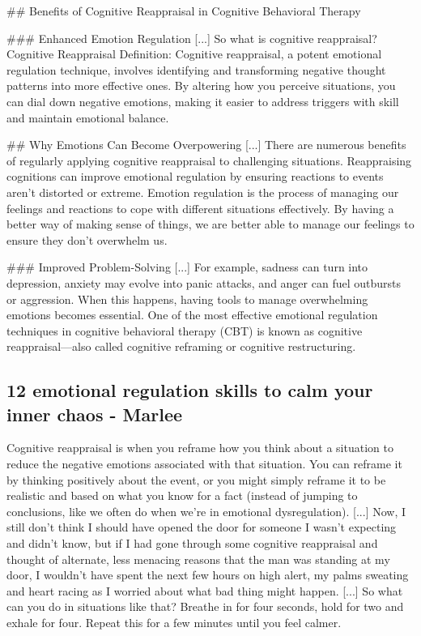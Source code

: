 \documentclass[12pt]{article}
\begin{document}
\#\# Benefits of Cognitive Reappraisal in Cognitive Behavioral Therapy

\#\#\# Enhanced Emotion Regulation [...] So what is cognitive reappraisal? Cognitive Reappraisal Definition: Cognitive reappraisal, a potent emotional regulation technique, involves identifying and transforming negative thought patterns into more effective ones. By altering how you perceive situations, you can dial down negative emotions, making it easier to address triggers with skill and maintain emotional balance.

\#\# Why Emotions Can Become Overpowering [...] There are numerous benefits of regularly applying cognitive reappraisal to challenging situations. Reappraising cognitions can improve emotional regulation by ensuring reactions to events aren't distorted or extreme. Emotion regulation is the process of managing our feelings and reactions to cope with different situations effectively.  By having a better way of making sense of things, we are better able to manage our feelings to ensure they don't overwhelm us.

\#\#\# Improved Problem-Solving [...] For example, sadness can turn into depression, anxiety may evolve into panic attacks, and anger can fuel outbursts or aggression. When this happens, having tools to manage overwhelming emotions becomes essential. One of the most effective emotional regulation techniques in cognitive behavioral therapy (CBT) is known as cognitive reappraisal—also called cognitive reframing or cognitive restructuring.\subsection{12 emotional regulation skills to calm your inner chaos - Marlee}
Cognitive reappraisal is when you reframe how you think about a situation to reduce the negative emotions associated with that situation. You can reframe it by thinking positively about the event, or you might simply reframe it to be realistic and based on what you know for a fact (instead of jumping to conclusions, like we often do when we’re in emotional dysregulation). [...] Now, I still don’t think I should have opened the door for someone I wasn’t expecting and didn’t know, but if I had gone through some cognitive reappraisal and thought of alternate, less menacing reasons that the man was standing at my door, I wouldn’t have spent the next few hours on high alert, my palms sweating and heart racing as I worried about what bad thing might happen. [...] So what can you do in situations like that? Breathe in for four seconds, hold for two and exhale for four. Repeat this for a few minutes until you feel calmer.
\end{document}

